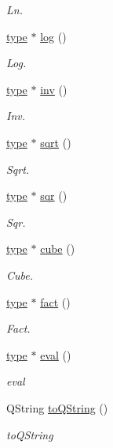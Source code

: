 \begin{DoxyCompactItemize}
\begin{DoxyCompactList}\small\item\em Ln. \end{DoxyCompactList}\item 
\hyperlink{classtype}{type} $\ast$ \hyperlink{classreel_adcf600e2052329def8e10e81e35ef96e}{log} ()
\begin{DoxyCompactList}\small\item\em Log. \end{DoxyCompactList}\item 
\hyperlink{classtype}{type} $\ast$ \hyperlink{classreel_ab863c6b28a5345dbf7657b4b5121c2f7}{inv} ()
\begin{DoxyCompactList}\small\item\em Inv. \end{DoxyCompactList}\item 
\hyperlink{classtype}{type} $\ast$ \hyperlink{classreel_a980bc278bf5537519ee05746262ebb6a}{sqrt} ()
\begin{DoxyCompactList}\small\item\em Sqrt. \end{DoxyCompactList}\item 
\hyperlink{classtype}{type} $\ast$ \hyperlink{classreel_ad295586d5862f6dc41966f25c365c4a1}{sqr} ()
\begin{DoxyCompactList}\small\item\em Sqr. \end{DoxyCompactList}\item 
\hyperlink{classtype}{type} $\ast$ \hyperlink{classreel_a3a2dc28d66ee81177a986fca957f6fd5}{cube} ()
\begin{DoxyCompactList}\small\item\em Cube. \end{DoxyCompactList}\item 
\hyperlink{classtype}{type} $\ast$ \hyperlink{classreel_ac56ec7c9e6b96b85723e518e70ecfc24}{fact} ()
\begin{DoxyCompactList}\small\item\em Fact. \end{DoxyCompactList}\item 
\hyperlink{classtype}{type} $\ast$ \hyperlink{classreel_a5d0427a4f39bbb96411cb5a1a0320625}{eval} ()
\begin{DoxyCompactList}\small\item\em eval \end{DoxyCompactList}\item 
Q\-String \hyperlink{classreel_a6b06a283958b63fde5c12382b744a8c9}{to\-Q\-String} ()
\begin{DoxyCompactList}\small\item\em to\-Q\-String \end{DoxyCompactList}\end{DoxyCompactItemize}
